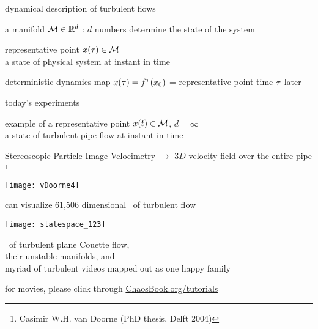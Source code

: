 \begin{frame}{dynamical description of turbulent flows}

\begin{block}{\statesp}
a manifold ${\cal M} \in \mathbb{R}^{d}$ :
$d$ numbers determine the state of the system
\end{block}

\bigskip

\begin{block}{representative point }
$x(\tau) \in {\cal M}$
\\
a state of physical system at instant in time
\end{block}

\bigskip

\begin{block}{deterministic dynamics}
map $x(\tau) = {f^{\tau}({x_0})}$ =
representative point time $\tau$ later
\end{block}
\end{frame}

\begin{frame}{today's experiments}
\begin{block}{example of a representative point }
$x(t) \in {\cal M}$, $d= \infty$ \\
a state of turbulent pipe flow at instant in time
\end{block}

\bigskip

Stereoscopic Particle Image Velocimetry $\to$
$3D$ velocity field over the entire pipe%
\footnote{
Casimir W.H. van Doorne
(PhD thesis, Delft  2004)
}

\bigskip

\begin{center}
\texttt{[image: vDoorne4]}
\end{center}
\end{frame}

\begin{frame}{can visualize 61,506 dimensional \statesp\ of turbulent flow}
\begin{center}
\texttt{[image: statespace\_123]}
\end{center}
\eqva\ of turbulent plane Couette flow,
\\
their unstable manifolds, and
\\
myriad of turbulent videos mapped out as one happy family

\bigskip

\hfill   {\small
          for movies, please click through
            \textcolor{blue}{\href{http://ChaosBook.org/tutorials}
             {ChaosBook.org/tutorials}}
          }
\end{frame}

